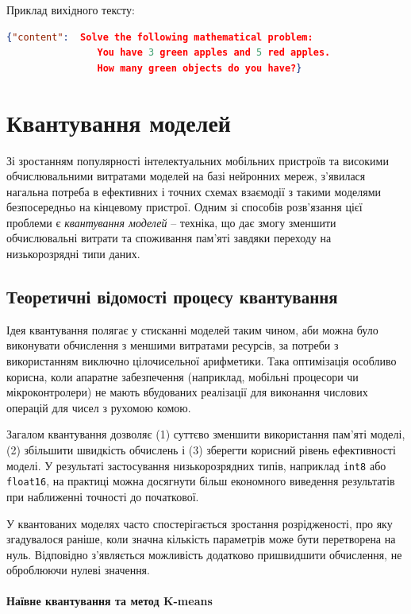 Приклад вихідного тексту:
\begin{lstlisting}[language=JSON, breaklines=true]
   {"content":  Solve the following mathematical problem:
                You have 3 green apples and 5 red apples.
                How many green objects do you have?}
\end{lstlisting}


\section{Квантування моделей}
\label{sec:quatisation}

Зі зростанням популярності інтелектуальних мобільних пристроїв та високими обчислювальними витратами моделей на базі нейронних мереж, з’явилася нагальна потреба в ефективних і точних схемах взаємодії з такими моделями безпосередньо на кінцевому пристрої. Одним зі способів розв’язання цієї проблеми є \emph{квантування моделей} -- техніка, що дає змогу зменшити обчислювальні витрати та споживання пам’яті завдяки переходу на низькорозрядні типи даних.

\subsection{Теоретичні відомості процесу квантування}

Ідея квантування полягає у стисканні моделей таким чином, аби можна було виконувати обчислення з меншими витратами ресурсів, за потреби з використанням виключно цілочисельної арифметики. Така оптимізація особливо корисна, коли апаратне забезпечення (наприклад, мобільні процесори чи мікроконтролери) не мають вбудованих реалізації для виконання числових операцій для чисел з рухомою комою.

Загалом квантування дозволяє (1) суттєво зменшити використання пам’яті моделі, (2) збільшити швидкість обчислень і (3) зберегти корисний рівень ефективності моделі. У результаті застосування низькорозрядних типів, наприклад \texttt{int8} або \texttt{float16}, на практиці можна досягнути більш економного виведення результатів при наближенні точності до початкової.

У квантованих моделях часто спостерігається зростання розрідженості, про яку згадувалося раніше, коли значна кількість параметрів може бути перетворена на нуль. Відповідно з’являється можливість додатково пришвидшити обчислення, не оброблюючи нулеві значення.

\paragraph{Наївне квантування та метод K-means}

